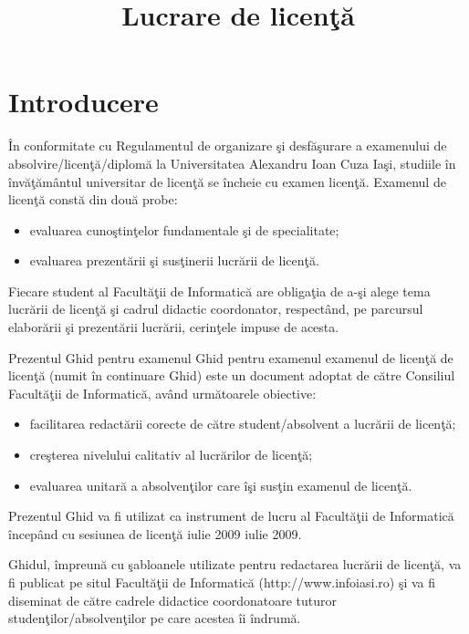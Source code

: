 \documentclass{article}
\title{\bf Lucrare de licen\c{t}\u{a}}
\begin{document}
  \maketitle
  \newpage

  \section {Introducere}

\^{I}n conformitate cu Regulamentul de organizare \c{s}i desf\u{a}\c{s}urare a examenului de
absolvire/licenţ\u{a}/diplom\u{a} la Universitatea Alexandru Ioan Cuza Ia\c{s}i, studiile \^{i}n
\^{i}nv\u{a}\c{t}\u{a}mântul universitar de licenţ\u{a} se \^{i}ncheie cu examen licenţ\u{a}. Examenul de licenţ\u{a}
const\u{a} din dou\u{a} probe: 

\begin{itemize}
  \item evaluarea cuno\c{s}tin\c{t}elor fundamentale \c{s}i de specialitate; 
  \item evaluarea prezent\u{a}rii \c{s}i sus\c{t}inerii lucr\u{a}rii de licen\c{t}\u{a}. 
\end{itemize}

Fiecare student al Facult\u{a}ţii de Informatic\u{a} are obligaţia de a-şi alege tema lucr\u{a}rii de
licenţ\u{a} şi cadrul didactic coordonator, respectând, pe parcursul elabor\u{a}rii şi prezent\u{a}rii
lucr\u{a}rii, cerinţele impuse de acesta.

Prezentul Ghid pentru examenul Ghid pentru examenul examenul de licenţ\u{a} de licenţ\u{a} (numit \^{i}n continuare Ghid) este un
document adoptat de c\u{a}tre Consiliul Facult\u{a}ţii de Informatic\u{a}, având urm\u{a}toarele
obiective:

\begin{itemize}
	\item facilitarea redact\u{a}rii corecte de c\u{a}tre student/absolvent a lucr\u{a}rii de licenţ\u{a};
	\item creşterea nivelului calitativ al lucr\u{a}rilor de licenţ\u{a};
	\item evaluarea unitar\u{a} a absolvenţilor care \^{i}şi susţin examenul de licenţ\u{a}. 
\end{itemize}

Prezentul Ghid va fi utilizat ca instrument de lucru al Facult\u{a}ţii de Informatic\u{a} \^{i}ncepând
cu sesiunea de licenţ\u{a} iulie 2009 iulie 2009.

Ghidul, \^{i}mpreun\u{a} cu şabloanele utilizate pentru redactarea lucr\u{a}rii de licenţ\u{a}, va fi
publicat pe situl Facult\u{a}ţii de Informatic\u{a} (http://www.infoiasi.ro) şi va fi diseminat de
c\u{a}tre cadrele didactice coordonatoare tuturor studenţilor/absolvenţilor pe care acestea \^{i}i
\^{i}ndrum\u{a}. 
\end{document}
